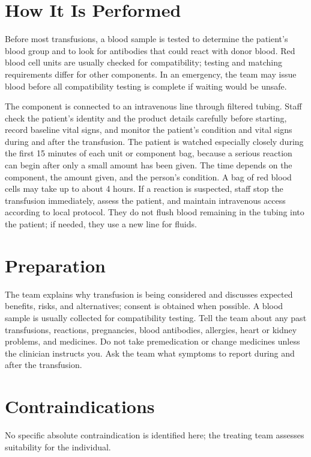 \section*{How It Is Performed}
Before most transfusions, a blood sample is tested to determine the patient's blood group and to look for antibodies that could react with donor blood. Red blood cell units are usually checked for compatibility; testing and matching requirements differ for other components. In an emergency, the team may issue blood before all compatibility testing is complete if waiting would be unsafe.

The component is connected to an intravenous line through filtered tubing. Staff check the patient's identity and the product details carefully before starting, record baseline vital signs, and monitor the patient's condition and vital signs during and after the transfusion. The patient is watched especially closely during the first 15 minutes of each unit or component bag, because a serious reaction can begin after only a small amount has been given. The time depends on the component, the amount given, and the person's condition. A bag of red blood cells may take up to about 4 hours. If a reaction is suspected, staff stop the transfusion immediately, assess the patient, and maintain intravenous access according to local protocol. They do not flush blood remaining in the tubing into the patient; if needed, they use a new line for fluids.

\section*{Preparation}
The team explains why transfusion is being considered and discusses expected benefits, risks, and alternatives; consent is obtained when possible. A blood sample is usually collected for compatibility testing. Tell the team about any past transfusions, reactions, pregnancies, blood antibodies, allergies, heart or kidney problems, and medicines. Do not take premedication or change medicines unless the clinician instructs you. Ask the team what symptoms to report during and after the transfusion.

\section*{Contraindications}
No specific absolute contraindication is identified here; the treating team assesses suitability for the individual.

